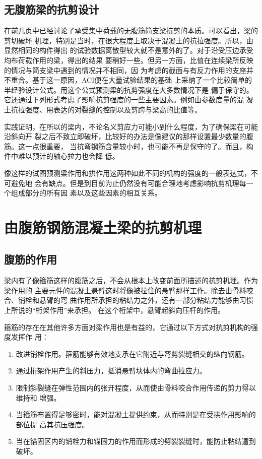 \documentclass[12pt,a4paper]{book}
\begin{document}
\subsection{无腹筋梁的抗剪设计}

在前几页中已经讨论了承受集中荷载的无腹筋简支梁抗剪的本质。可以看出，梁的剪切破坏
机理，特别是当时，在很大程度上取决于混凝土的抗拉强度。所以，由显然相同的构件得出
的试验数据离散型较大就不是意外的了。对于沿受压边承受均布荷载作用的梁，得出的结果
要稍好一些。但另一方面，比值在连续梁所反映的情况与简支梁中遇到的情况并不相同，因
为考虑的截面与有反力作用的支座并不重合。基于这一原因，ACI便在大量试验结果的基础
上采纳了一个比较简单的半经验设计公式。用这个公式预测梁的抗剪强度在大多数情况下是
偏于保守的。它还通过下列形式考虑了影响抗剪强度的一些主要因素。例如由参数度量的混
凝土抗拉强度、用表达的对裂缝的控制以及剪跨与梁高的比值等。

实践证明，在所以的梁内，不论名义剪应力可能小到什么程度，为了确保梁在可能沿斜向开
裂之后不致立即破坏，比较好的办法是像建议的那样设置最少数量的腹筋。这一点很重要，
当抗弯钢筋含量较小时，也可能不再是保守的了。而且，构件中难以预计的轴心拉力也会降
低。

像这样的试图预测梁作用和拱作用这两种如此不同的机构的强度的一般表达式，不可避免地
会有缺点。但是到目前为止仍然没有可能合理地考虑影响抗剪机理每一个组成部分的所有因
素以及这些因素的相互关系。

\section{由腹筋钢筋混凝土梁的抗剪机理}

\subsection{腹筋的作用}

梁内有了像箍筋这样的腹筋之后，不会从根本上改变前面所描述的抗剪机理。作为梁作用的
主要元件的混凝土悬臂这时将像被拉住的悬臂那样工作。除去由骨料咬合、销栓和悬臂的弯
曲作用所承担的粘结力之外，还有一部分粘结力能够由习惯上所说的“桁架作用”来承担。
在这个桁架中，悬臂起斜向压杆的作用。

箍筋的存在在其他许多方面对梁作用也是有益的，它通过以下方式对抗剪机构的强度发挥作
用：
\begin{enumerate}
\item 改进销栓作用。箍筋能够有效地支承在它附近与弯剪裂缝相交的纵向钢筋。
\item 通过桁架作用产生的斜压力，抵消悬臂块体内的弯曲拉应力。
\item 限制斜裂缝在弹性范围内的张开程度，从而使由骨料咬合作用传递的剪力得以维持和
  增强。
\item 当箍筋布置得足够密时，能对混凝土提供约束，从而特别是在受拱作用影响的部位提
  高其抗压强度。
\item 当在锚固区内的销栓力和锚固力的作用而形成的劈裂裂缝时，能防止粘结遭到破坏。
\end{enumerate}
\end{document}
